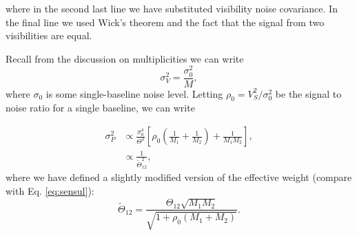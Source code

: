 \documentclass[preprint2,numberedappendix,tighten,twocolappendix]{aastex6}  %
\renewcommand\[{\begin{equation}}
\renewcommand\]{\end{equation}}
\begin{document}
where in the second last line we have substituted visibility noise covariance. In the final line we used Wick's theorem and the fact that the signal from two visibilities are equal. 

Recall from the discussion on multiplicities we can write
\begin{equation}
\sigma_V^2=\frac{\sigma_0^2}{M},
\end{equation}
where $\sigma_0$ is some single-baseline noise level. Letting $\rho_0=V_S^2/\sigma_0^2$ be the signal to noise ratio for a single baseline, we can write

\begin{equation}
\begin{aligned}
\sigma_P^2 & \propto  \frac{\sigma_0^4}{\Theta^2} \left[ \rho_0 \left(\frac{1}{M_1}+\frac{1}{M_2} \right) + \frac{1}{M_1 M_2}\right], \\
&\propto \frac{1}{\widetilde{\Theta}_{12}^2},
\end{aligned}
\end{equation}
where we have defined a slightly modified version of the effective weight (compare with Eq. \ref{eq:sensul}):
\begin{equation}
\widetilde{\Theta}_{12}=\frac{\Theta_{12}\sqrt{M_1M_{2}}}{\sqrt{1 + \rho_0 \left(M_1+M_{2} \right)}}.
\end{equation}


\end{document}
